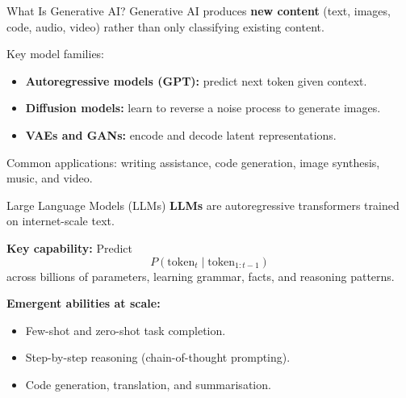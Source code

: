 \documentclass[10pt]{beamer}
\begin{document}
\begin{frame}{What Is Generative AI?}
    Generative AI produces \textbf{new content} (text, images, code, audio, video) rather than only classifying existing content.

    \vspace{0.2cm}
    Key model families:
    \begin{itemize}
        \item \textbf{Autoregressive models (GPT):} predict next token given context.
        \item \textbf{Diffusion models:} learn to reverse a noise process to generate images.
        \item \textbf{VAEs and GANs:} encode and decode latent representations.
    \end{itemize}

    \vspace{0.2cm}
    Common applications: writing assistance, code generation, image synthesis, music, and video.
\end{frame}

\begin{frame}{Large Language Models (LLMs)}
    \textbf{LLMs} are autoregressive transformers trained on internet-scale text.

    \vspace{0.2cm}
    \textbf{Key capability:} Predict
    \[
        P(\text{token}_t \mid \text{token}_{1:t-1})
    \]
    across billions of parameters, learning grammar, facts, and reasoning patterns.

    \vspace{0.2cm}
    \textbf{Emergent abilities at scale:}
    \begin{itemize}
        \item Few-shot and zero-shot task completion.
        \item Step-by-step reasoning (chain-of-thought prompting).
        \item Code generation, translation, and summarisation.
    \end{itemize}
\end{frame}
\end{document}

